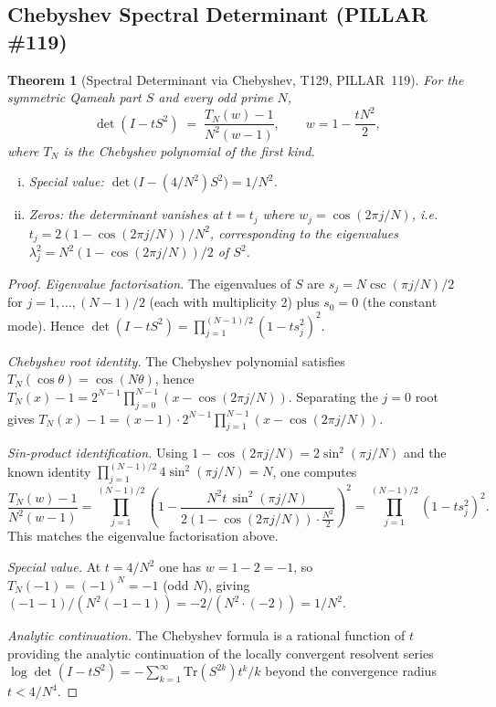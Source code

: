 \documentclass[aps,prd,twocolumn,superscriptaddress,floatfix,nofootinbib]{revtex4-2}
\newtheorem{theorem}{Theorem}
\theoremstyle{definition}
\theoremstyle{remark}
\begin{document}
\subsection{Chebyshev Spectral Determinant (PILLAR \#119)}
\label{sec:chebyshev-det}

\begin{theorem}[Spectral Determinant via Chebyshev, T129, PILLAR~119]
\label{thm:chebyshev-det}
  For the symmetric Qameah part $S$ and every odd prime $N$,
  \[
    \det(I - t S^2)
      \;=\;
      \frac{T_N(w) - 1}{N^2(w-1)},
    \qquad
    w = 1 - \frac{t N^2}{2},
  \]
  where $T_N$ is the Chebyshev polynomial of the first kind.
  \begin{enumerate}[(i)]
    \item \emph{Special value:} $\det\!\bigl(I - (4/N^2)S^2\bigr) = 1/N^2$.
    \item \emph{Zeros:} the determinant vanishes at $t = t_j$ where
      $w_j = \cos(2\pi j/N)$, i.e.\ $t_j = 2(1-\cos(2\pi j/N))/N^2$,
      corresponding to the eigenvalues $\lambda_j^2 = N^2(1-\cos(2\pi j/N))/2$
      of $S^2$.
  \end{enumerate}
\end{theorem}

\begin{proof}
  \emph{Eigenvalue factorisation.}
  The eigenvalues of $S$ are $s_j = N\csc(\pi j/N)/2$ for $j=1,\ldots,(N-1)/2$
  (each with multiplicity 2) plus $s_0=0$ (the constant mode).  Hence
  $\det(I-tS^2) = \prod_{j=1}^{(N-1)/2}(1-ts_j^2)^2$.

  \emph{Chebyshev root identity.}
  The Chebyshev polynomial satisfies
  $T_N(\cos\theta) = \cos(N\theta)$, hence
  $T_N(x)-1 = 2^{N-1}\prod_{j=0}^{N-1}(x-\cos(2\pi j/N))$.
  Separating the $j=0$ root gives
  $T_N(x)-1 = (x-1)\cdot 2^{N-1}\prod_{j=1}^{N-1}(x-\cos(2\pi j/N))$.

  \emph{Sin-product identification.}
  Using $1-\cos(2\pi j/N) = 2\sin^2(\pi j/N)$ and the known identity
  $\prod_{j=1}^{(N-1)/2} 4\sin^2(\pi j/N) = N$, one computes
  \[
    \frac{T_N(w)-1}{N^2(w-1)}
      = \prod_{j=1}^{(N-1)/2}\!\left(1 - \frac{N^2 t\,\sin^2(\pi j/N)}{2(1-\cos(2\pi j/N))\cdot\tfrac{N^2}{2}}\right)^2
      = \prod_{j=1}^{(N-1)/2}(1 - ts_j^2)^2.
  \]
  This matches the eigenvalue factorisation above.

  \emph{Special value.}
  At $t = 4/N^2$ one has $w = 1 - 2 = -1$, so $T_N(-1) = (-1)^N = -1$ (odd $N$),
  giving $(-1-1)/(N^2(-1-1)) = -2/(N^2 \cdot (-2)) = 1/N^2$.

  \emph{Analytic continuation.}
  The Chebyshev formula is a rational function of $t$ providing the analytic
  continuation of the locally convergent resolvent series
  $\log\det(I-tS^2) = -\sum_{k=1}^\infty \mathrm{Tr}(S^{2k})t^k/k$ beyond
  the convergence radius $t < 4/N^4$.
\end{proof}
\end{document}

